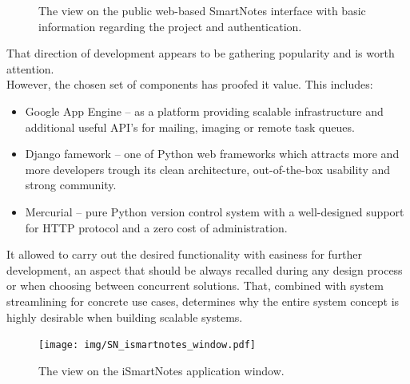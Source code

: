 \begin{figure}[ht]
\begin{center}
  \end{center}
  \caption{The view on the public web-based SmartNotes interface with basic information regarding the project and authentication.}
  \label{fig:sn_web_interface}
\end{figure}
That direction of development appears to be gathering popularity and is worth attention. \\However, the chosen set of components has proofed it value. This includes:
 \begin{itemize}
        \item{Google App Engine -- as a platform providing scalable infrastructure and additional useful API's for mailing, imaging or remote task queues.}
        \item{Django famework -- one of Python web frameworks which attracts more and more developers trough its clean architecture, out-of-the-box usability and strong community.}
        \item{Mercurial -- pure Python version control system with a well-designed support for HTTP protocol and a zero cost of administration.}
 \end{itemize}
It allowed to carry out the desired functionality with easiness for further development, an aspect that should be always recalled during any design process or when choosing between concurrent solutions. That, combined with system streamlining for concrete use cases, determines why the entire system concept is highly desirable when building scalable systems.
        
\begin{figure}[ht]
\begin{center}
\texttt{[image: img/SN\_ismartnotes\_window.pdf]}
\caption{The view on the iSmartNotes application window.}
\label{fig:ismartnotes_window}
\end{center}
\end{figure}
 
